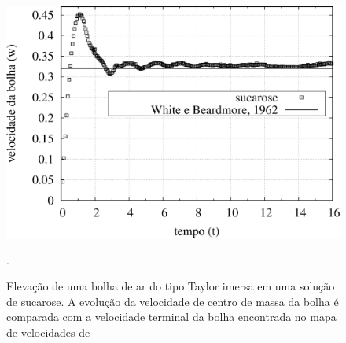 \documentclass[a4paper,portuges]{article}
\begin{document}
 \begin{figure}[h!]
 	\begin{center}
 		\includegraphics[angle=0, scale=0.5]{figs/sucrose.pdf}
 	\end{center}
	\caption{Elevação de uma bolha de ar do tipo Taylor imersa em uma
	solução de sucarose. A evolução da velocidade de centro de massa da
	bolha é comparada com a velocidade terminal da bolha encontrada no
	mapa de velocidades de \cite{white1962}}.
   \label{fig:sucroseVel}
 \end{figure}
\end{document}
